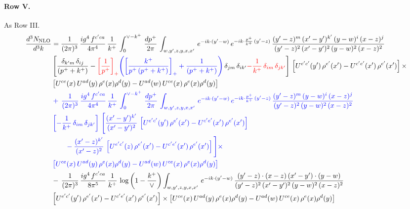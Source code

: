 \documentclass[10pt]{article}
\numberwithin{equation}{section}
\newcommand{\new}[1]{{\color{blue}#1}}
\newcommand{\old}[1]{{\color{red}#1}}
\newcommand{\nc}{\color{blue}}
\begin{document}
\paragraph{Row V.}
As Row III.
\begin{align}
    \frac{d^{3}N_{\rm NLO}}{d^{3}k} & =  \frac{1}{(2\pi)^{3}}\, \frac{ig^{4}\,f^{c'ca}}{4\pi^{4}}\, \frac{1}{k^{+}}\,\int_{0}^{\vee-k^{+}}\, \frac{dp^{+}}{2\pi}\, \int_{w,y',z,y,x,x'}\, e^{-ik\cdot (y'-w)}\, e^{-ik\cdot \frac{p^{+}}{k^{+}}\,(y'-z)}\,\frac{(y'-z)^{m}\,(x'-y')^{k'}\,(y-w)^{i}\,(x-z)^{j}}{(y'-z)^{2}\,(x'-y')^{2}\,(y-w)^{2}\,(x-z)^{2}}\notag \\ & \left[\frac{\delta_{k'm}\,\delta_{ij}}{(p^{+}+k^{+})}-\old{\left[\frac{1}{p^{+}}\right]_{+}}\new{\left(\left[\frac{k^{+}}{p^{+}\,(p^{+}+k^{+})}\right]_{+}+\frac{1}{(p^{+}+k^{+})}\right)}\,\delta_{jm}\,\delta_{ik'}\old{-\frac{1}{k^{+}}\, \delta_{im}\, \delta_{jk'}}\right]\, \left[U^{e'c'}(y')\,\rho^{e'}(x')-U^{c'e'}(x')\,\rho^{e'}(x')\right]\times \notag \\ &  \left[U^{ce}(x)\,U^{ad}(y)\,\rho^{e}(x)\rho^{d}(y)-U^{ad}(w)\,U^{ce}(x)\,\rho^{e}(x)\rho^{d}(y)\right] \notag \\
& \nc  +\,\frac{1}{(2\pi)^{3}}\, \frac{ig^{4}\,f^{c'ca}}{4\pi^{4}}\, \frac{1}{k^{+}}\,\int_{0}^{\vee-k^{+}}\, \frac{dp^{+}}{2\pi}\, \int_{w,y',z,y,x,x'}\, e^{-ik\cdot (y'-w)}\, e^{-ik\cdot \frac{p^{+}}{k^{+}}\,(y'-z)}\,\frac{(y'-z)^{m}\,(y-w)^{i}\,(x-z)^{j}}{(y'-z)^{2}\,(y-w)^{2}\,(x-z)^{2}}\notag \\ & \nc  \left[-\frac{1}{k^{+}}\, \delta_{im}\, \delta_{jk'}\right]\, \Bigg[\frac{(x'-y')^{k'}}{(x'-y')^{2}}\,\left[U^{e'c'}(y')\,\rho^{e'}(x')-U^{c'e'}(x')\,\rho^{e'}(x')\right]\notag \\ & \nc  \qquad-\frac{(x'-z)^{k'}}{(x'-z)^{2}}\,\left[U^{e'c'}(z)\,\rho^{e'}(x')-U^{c'e'}(x')\,\rho^{e'}(x')\right]\Bigg]\times \notag \\ & \nc   \left[U^{ce}(x)\,U^{ad}(y)\,\rho^{e}(x)\rho^{d}(y)-U^{ad}(w)\,U^{ce}(x)\,\rho^{e}(x)\rho^{d}(y)\right] \notag \\
& -\,\frac{1}{(2\pi)^{3}}\, \frac{ig^{4}\,f^{c'ca}}{8\pi^{5}}\, \frac{1}{k^{+}}\,\log{\left(1-\frac{k^{+}}{\vee}\right)} \int_{w,y',z,y,x,x'}\, e^{-ik\cdot (y'-w)}\,\frac{(y'-z)\cdot (x-z)\,(x'-y')\cdot (y-w)}{(y'-z)^{2}\,(x'-y')^{2}\,(y-w)^{2}\,(x-z)^{2}}\notag \\ & \left[U^{e'c'}(y')\,\rho^{e'}(x')-U^{c'e'}(x')\,\rho^{e'}(x')\right]\times  \left[U^{ce}(x)\,U^{ad}(y)\,\rho^{e}(x)\rho^{d}(y)-U^{ad}(w)\,U^{ce}(x)\,\rho^{e}(x)\rho^{d}(y)\right] \label{eq:F:G3V}
\end{align}
\end{document}
